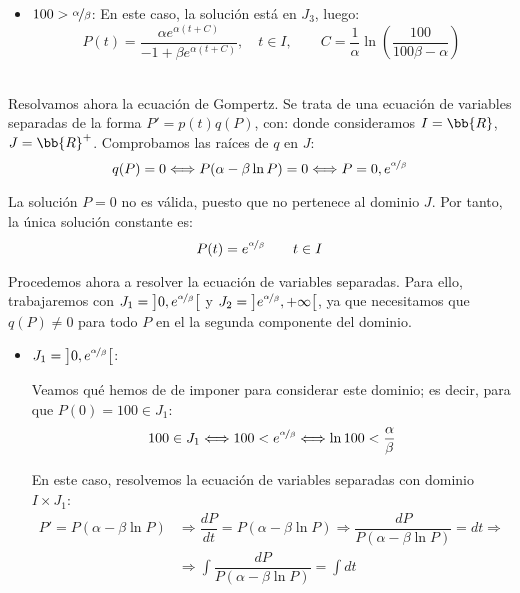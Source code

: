 \begin{ejercicio}
\begin{itemize}
        \item \ul{$100>\nicefrac{\alpha}{\beta}$}: En este caso, la solución está en $J_3$, luego:
        \begin{equation*}
            P(t) = \dfrac{\alpha e^{\alpha (t + C)}}{-1+\beta e^{\alpha (t + C)}}, \quad t\in I, \qquad C=\dfrac{1}{\alpha}\ln\left(\dfrac{100}{100\beta-\alpha}\right)
        \end{equation*}
    \end{itemize}~\\

    Resolvamos ahora la ecuación de Gompertz. Se trata de una ecuación de variables separadas de la forma $P' = p(t)q(P)$, con:
    donde consideramos $I=\bb{R}$, $J=\bb{R}^+$. Comprobamos las raíces de $q$ en $J$:
    \begin{equation*}
        q(P) = 0 \Longleftrightarrow P(\alpha - \beta \ln P) = 0 \Longleftrightarrow P=0, e^{\nicefrac{\alpha}{\beta}}
    \end{equation*}

    La solución $P=0$ no es válida, puesto que no pertenece al dominio $J$. Por tanto, la única solución constante es:
    \begin{equation*}
        P(t) = e^{\nicefrac{\alpha}{\beta}} \qquad t\in I
    \end{equation*}

    Procedemos ahora a resolver la ecuación de variables separadas. Para ello, trabajaremos con $J_1=\left]0,e^{\nicefrac{\alpha}{\beta}}\right[$ y $J_2=\left]e^{\nicefrac{\alpha}{\beta}}, +\infty\right[$, ya que necesitamos que $q(P)\neq 0$ para todo $P$ en el la segunda componente del dominio.
    \begin{itemize}
        \item \ul{$J_1=\left]0,e^{\nicefrac{\alpha}{\beta}}\right[$}:
        
        Veamos qué hemos de de imponer para considerar este dominio; es decir, para que $P(0)=100\in J_1$:
        \begin{equation*}
            100\in J_1 \Longleftrightarrow 100<e^{\nicefrac{\alpha}{\beta}} \Longleftrightarrow \ln 100 < \dfrac{\alpha}{\beta}
        \end{equation*}

        En este caso, resolvemos la ecuación de variables separadas con dominio $I\times J_1$:
        \begin{align*}
            P' = P(\alpha - \beta \ln P) &\Longrightarrow \dfrac{dP}{dt} = P(\alpha - \beta \ln P) \Longrightarrow \dfrac{dP}{P(\alpha - \beta \ln P)} = dt \Longrightarrow \\ &\Longrightarrow \int \dfrac{dP}{P(\alpha - \beta \ln P)} = \int dt
        \end{align*}


\end{itemize}
\end{ejercicio}
